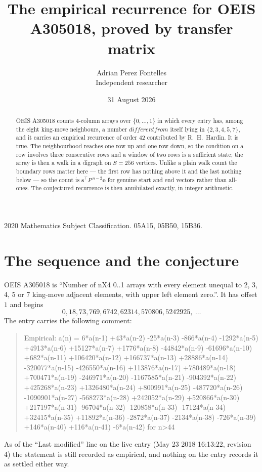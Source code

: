 \documentclass[11pt,a4paper]{article}
\title{The empirical recurrence for OEIS A305018, proved by transfer matrix}
\author{Adrian Perez Fontelles\\ \small Independent researcher}
\date{31 August 2026}
\theoremstyle{plain}
\theoremstyle{definition}
\begin{document}
\maketitle

\begin{abstract}
OEIS A305018 counts $4$-column arrays over $\{0,\dots,1\}$ in which every entry has,
among the eight king-move neighbours, a number $different from$ itself lying in $\{2,3,4,5,7\}$, and it carries an empirical
recurrence of order $42$ contributed by R.~H.~Hardin. It is true. The neighbourhood
reaches one row up and one row down, so the condition on a row involves three consecutive
rows and a window of two rows is a sufficient state; the array is then a walk in a digraph
on $S=256$ vertices. Unlike a plain walk count the boundary rows matter here --- the first
row has nothing above it and the last nothing below --- so the count is
$\mathbf{s}^{\!\top}P^{\,n-2}\mathbf{e}$ for genuine start and end vectors rather than
all-ones. The conjectured recurrence is then annihilated exactly, in integer arithmetic.
\end{abstract}

\noindent\small 2020 Mathematics Subject Classification. 05A15, 05B50, 15B36.\normalsize

\section{The sequence and the conjecture}

OEIS A305018 is ``Number of nX4 0..1 arrays with every element unequal to 2, 3, 4, 5 or 7 king-move adjacent elements, with upper left element zero.''. It has offset
$1$ and begins
\[
0, 18, 73, 769, 6742, 62314, 570806, 5242925,\ \dots
\]
The entry carries the following comment:
\begin{quote}\small
Empirical: a(n) = 6*a(n-1) +43*a(n-2) -25*a(n-3) -866*a(n-4) -1292*a(n-5) +4913*a(n-6) +15127*a(n-7) +1776*a(n-8) -44842*a(n-9) -61696*a(n-10) +682*a(n-11) +106420*a(n-12) +166737*a(n-13) +28886*a(n-14) -320077*a(n-15) -426550*a(n-16) +113876*a(n-17) +780489*a(n-18) +700471*a(n-19) -246971*a(n-20) -1167585*a(n-21) -904392*a(n-22) +425268*a(n-23) +1326480*a(n-24) +800991*a(n-25) -487720*a(n-26) -1090901*a(n-27) -568273*a(n-28) +242052*a(n-29) +520866*a(n-30) +217197*a(n-31) -96704*a(n-32) -120858*a(n-33) -17124*a(n-34) +32415*a(n-35) +11892*a(n-36) -2872*a(n-37) -2134*a(n-38) -726*a(n-39) +146*a(n-40) +116*a(n-41) -6*a(n-42) for n>44
\end{quote}
As of the ``Last modified'' line on the live entry (May 23 2018 16:13:22, revision
4) the statement is still recorded as empirical, and nothing on the entry
records it as settled either way.
\end{document}
